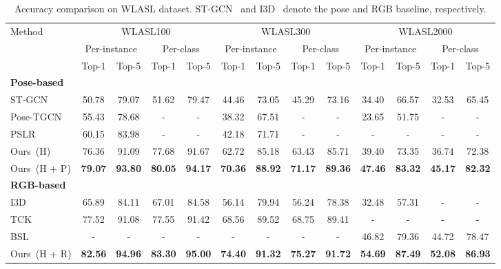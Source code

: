 \documentclass[10pt,twocolumn,letterpaper]{article}
\begin{document}
\begin{table*}
\small
\tabcolsep=6.5pt
\begin{center}
\begin{threeparttable}
\begin{tabular}{l|cc|cc|cc|cc|cc|cc}
\hline
\multirow{3}{*}{Method} & \multicolumn{4}{c|}{WLASL100}
                        & \multicolumn{4}{c|}{WLASL300}
                        & \multicolumn{4}{c}{WLASL2000}\\ \cline{2-13}
        & \multicolumn{2}{c|}{Per-instance} & \multicolumn{2}{c|}{Per-class} 
        & \multicolumn{2}{c|}{Per-instance} & \multicolumn{2}{c|}{Per-class}
        & \multicolumn{2}{c|}{Per-instance} & \multicolumn{2}{c}{Per-class} \\
        & Top-1 & Top-5 & Top-1 & Top-5 
        & Top-1 & Top-5 & Top-1 & Top-5   
        & Top-1 & Top-5 & Top-1 & Top-5    \\ \hline \hline
\textbf{Pose-based} & & & & & & & & & & & & \\
ST-GCN~\cite{yan2018spatial} & 50.78 & 79.07 & 51.62 & 79.47   
        & 44.46 & 73.05 & 45.29 & 73.16
        & 34.40 & 66.57 & 32.53 & 65.45 \\ 
Pose-TGCN~\cite{li2020word} & 55.43 & 78.68 & - & -   
        & 38.32 & 67.51 & - & -
        & 23.65 & 51.75 & - & - \\ 
PSLR~\cite{tunga2020pose} & 60.15 & 83.98 & - & -   
        & 42.18 & 71.71 & - & -
        & - & - & - & - \\ 
Ours~(H) & 76.36 & 91.09 & 77.68 & 91.67  
         & 62.72 & 85.18 & 63.43 & 85.71 
         & 39.40 & 73.35 & 36.74 & 72.38 \\
Ours~(H + P) & \textbf{79.07} & \textbf{93.80} & \textbf{80.05} & \textbf{94.17} 
             & \textbf{70.36} & \textbf{88.92} & \textbf{71.17} & \textbf{89.36}
             & \textbf{47.46} & \textbf{83.32} & \textbf{45.17} & \textbf{82.32} \\ \hline
\textbf{RGB-based} & & & & & & & & & & & & \\
I3D~\cite{li2020word}  & 65.89 & 84.11 & 67.01 & 84.58  
        & 56.14 & 79.94 & 56.24 & 78.38
        & 32.48 & 57.31 & - & - \\ 
TCK~\cite{li2020transfer} & 77.52 & 91.08 & 77.55 & 91.42   
        & 68.56 & 89.52 & 68.75 & 89.41
        & - & - & - & - \\ 
BSL~\cite{albanie2020bsl}  & - & - & - & -  
        & - & - & - & -
        & 46.82 & 79.36 & 44.72 & 78.47 \\ 
Ours~(H + R)   & \textbf{82.56} & \textbf{94.96} & \textbf{83.30} & \textbf{95.00}
             & \textbf{74.40} & \textbf{91.32} & \textbf{75.27} & \textbf{91.72}
             & \textbf{54.69} & \textbf{87.49} & \textbf{52.08} & \textbf{86.93} \\ \hline 
\end{tabular}
\end{threeparttable}
\end{center}
\caption{Accuracy comparison on WLASL dataset. ST-GCN~\cite{yan2018spatial} and I3D~\cite{li2020word} denote the pose and RGB baseline, respectively.}
\label{wlasl}
\vspace{-0.3cm}
\end{table*}
\end{document}
